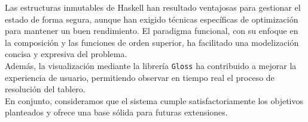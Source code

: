 \documentclass{article}
\begin{document}
Las estructuras inmutables de Haskell han resultado ventajosas para gestionar el estado de forma segura, aunque han exigido técnicas específicas de optimización para mantener un buen rendimiento. El paradigma funcional, con su enfoque en la composición y las funciones de orden superior, ha facilitado una modelización concisa y expresiva del problema.\\

Además, la visualización mediante la librería \texttt{Gloss} ha contribuido a mejorar la experiencia de usuario, permitiendo observar en tiempo real el proceso de resolución del tablero.\\

En conjunto, consideramos que el sistema cumple satisfactoriamente los objetivos planteados y ofrece una base sólida para futuras extensiones.\\
\end{document}
